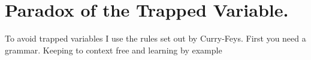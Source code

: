 
\section{Paradox of the Trapped Variable.}

To avoid trapped variables I use the rules set out by Curry-Feys.
First you need a grammar.  Keeping to context free and learning by example
